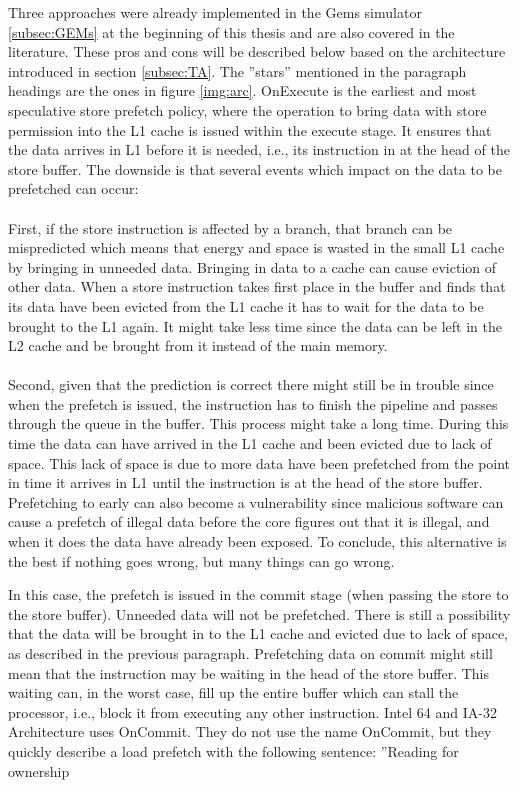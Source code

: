 Three approaches were already implemented in the Gems simulator \ref{subsec:GEMs} at the beginning of this thesis and are also covered in the literature. These pros and cons will
be described below based on the architecture introduced in section \ref{subsec:TA}. The ”stars”
mentioned in the paragraph headings are the ones in figure \ref{img:arc}.
  OnExecute \cite{ONEX} is the earliest and most speculative store
prefetch policy, where the operation to bring data with store permission into the
L1 cache is issued within the execute stage. It ensures that the data arrives in L1
before it is needed, i.e., its instruction in at the head of the store buffer. The downside
is that several events which impact on the data to be prefetched can occur:
\\\\ First, if
the store instruction is affected by a branch, that branch can be mispredicted which
means that energy and space is wasted in the small L1 cache by bringing in unneeded
data. Bringing in data to a cache can cause eviction of other data. When a store
instruction takes first place in the buffer and finds that its data have been evicted
from the L1 cache it has to wait for the data to be brought to the L1 again. It might
take less time since the data can be left in the L2 cache and be brought from it instead
of the main memory.
\\ \\
Second, given that the prediction is correct there might still be in trouble since when the
prefetch is issued, the instruction has to finish the pipeline and passes through the queue in the buffer. This process might
take a long time. During this time the data can have arrived in the L1 cache and been
evicted due to lack of space. This lack of space is due to more data have been prefetched from the point in
time it arrives in L1 until the instruction is at the head of the store buffer. Prefetching to early
can also become a vulnerability since malicious software can cause a prefetch of illegal data
before the core figures out that it is illegal, and when it does the data have already
been exposed. To conclude, this alternative is the best if nothing goes wrong, but
many things can go wrong.

 In this case, the prefetch is issued in the commit stage (when passing
the store to the store buffer). Unneeded data will not be
prefetched. There is still a possibility that the data will be brought in to the L1 cache and evicted
due to lack of space, as described in the previous paragraph. Prefetching
data on commit might still mean that the instruction may be waiting in the head
of the store buffer. This waiting can, in the worst case, fill up the entire buffer which can stall the
processor, i.e., block it from executing any other instruction. Intel 64 and IA-32 Architecture \cite{ONCO} uses OnCommit. They do not use the name OnCommit, but they
quickly describe a load prefetch with the following sentence: ”Reading for ownership

